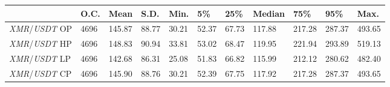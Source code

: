 \begin{tabular}{lllllllllll}
\toprule
 & \textbf{O.C.} & \textbf{Mean} & \textbf{S.D.} & \textbf{Min.} & \textbf{5\%} & \textbf{25\%} & \textbf{Median} & \textbf{75\%} & \textbf{95\%} & \textbf{Max.} \\
\midrule
\emph{XMR}/\emph{USDT} OP & 4696 & 145.87 & 88.77 & 30.21 & 52.37 & 67.73 & 117.88 & 217.28 & 287.37 & 493.65 \\
\emph{XMR}/\emph{USDT} HP & 4696 & 148.83 & 90.94 & 33.81 & 53.02 & 68.47 & 119.95 & 221.94 & 293.89 & 519.13 \\
\emph{XMR}/\emph{USDT} LP & 4696 & 142.68 & 86.31 & 25.08 & 51.83 & 66.82 & 115.99 & 212.12 & 280.62 & 482.40 \\
\emph{XMR}/\emph{USDT} CP & 4696 & 145.90 & 88.76 & 30.21 & 52.39 & 67.75 & 117.92 & 217.28 & 287.37 & 493.65 \\
\bottomrule
\end{tabular}
